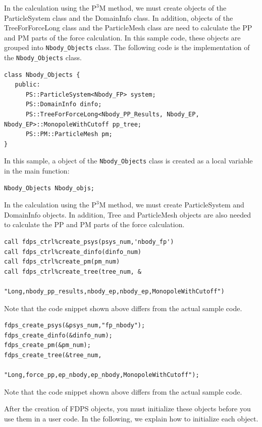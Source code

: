 \ifCpp
In the calculation using the $\mathrm{P^{3}M}$ method, we must create objects of the \textsf{ParticleSystem} class and the \textsf{DomainInfo} class. In addition, objects of the \textsf{TreeForForceLong} class and the \textsf{ParticleMesh} class are need to calculate the PP and PM parts of the force calculation. In this sample code, these objects are grouped into \texttt{Nbody\_Objects} class. The following code is the implementation of the \texttt{Nbody\_Objects} class.
\begin{lstlisting}[caption=\texttt{Nbody\_Objects} class]
class Nbody_Objects {
   public:
      PS::ParticleSystem<Nbody_FP> system;
      PS::DomainInfo dinfo;
      PS::TreeForForceLong<Nbody_PP_Results, Nbody_EP, Nbody_EP>::MonopoleWithCutoff pp_tree;
      PS::PM::ParticleMesh pm;
}
\end{lstlisting}
In this sample, a object of the \texttt{Nbody\_Objects} class is created as a local variable in the main function:
\begin{lstlisting}[caption=Creation of a \texttt{Nbody\_Objects}-class object]
Nbody_Objects Nbody_objs;
\end{lstlisting}
\endifCpp

\ifIF
In the calculation using the $\mathrm{P^{3}M}$ method, we must create \textsf{ParticleSystem} and \textsf{DomainInfo} objects. In addition, \textsf{Tree} and \textsf{ParticleMesh} objects are also needed to calculate the PP and PM parts of the force calculation.
\endifIF
\ifFtn
\begin{lstlisting}[caption=Creation of FDPS objects]
call fdps_ctrl%create_psys(psys_num,'nbody_fp')
call fdps_ctrl%create_dinfo(dinfo_num)
call fdps_ctrl%create_pm(pm_num)
call fdps_ctrl%create_tree(tree_num, &                                                  
                           "Long,nbody_pp_results,nbody_ep,nbody_ep,MonopoleWithCutoff")
\end{lstlisting}
Note that the code snippet shown above differs from the actual sample code.
\endifFtn
\ifC
\begin{lstlisting}[caption=Creation of FDPS objects]
fdps_create_psys(&psys_num,"fp_nbody");
fdps_create_dinfo(&dinfo_num);
fdps_create_pm(&pm_num);
fdps_create_tree(&tree_num,
                 "Long,force_pp,ep_nbody,ep_nbody,MonopoleWithCutoff");
\end{lstlisting}
Note that the code snippet shown above differs from the actual sample code.
\endifC


After the creation of FDPS objects, you must initialize these objects before you use them in a user code. In the following, we explain how to initialize each object.

